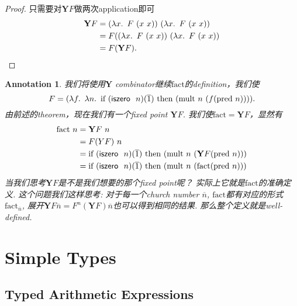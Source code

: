 \documentclass{article}
\theoremstyle{plain}
\newtheorem{annotation}[theorem]{Annotation}
\theoremstyle{nonumberplain}
\newtheorem{proof}{Proof}
\newcommand{\lam}[2]{\ensuremath{\lambda #1\ldotp~ #2}} %
\newcommand{\term}[1]{\ensuremath\mathsf{#1}}
\newcommand{\iszero}[1]{\term{iszero}~#1}
\begin{document}
\begin{proof}
只需要对$\mathbf{Y}F$做两次application即可
$$
\begin{aligned}
\mathbf{Y}F &= (\lam{x}{F~(x~x)})~(\lam{x}{F~(x~x)}) \\
&= F((\lam{x}{F~(x~x)})~(\lam{x}{F~(x~x)}) \\
&= F(\mathbf{Y}F). 
\end{aligned}
$$
\end{proof}

\begin{annotation}
\rm 我们将使用$\mathbf{Y}$ combinator继续$\text{fact}$的definition，我们使\[F = (\lam{f}{\lam{n}{\text{if}~(\iszero~n)(\overline{1})~\text{then}~(\text{mult}~n~(f(\text{pred}~n)))}}).\]由前述的theorem，现在我们有一个fixed point $\mathbf{Y}F$. 我们使$\text{fact} = \mathbf{Y}F$，显然有
$$
\begin{aligned}
\text{fact}~n &= \mathbf{Y}F~n \\
&= F({Y}F)~n \\
&= \text{if}~(\iszero~n)(\overline{1})~\text{then}~(\text{mult}~n~(\mathbf{Y}F(\text{pred}~n))) \\
&= \text{if}~(\iszero~n)(\overline{1})~\text{then}~(\text{mult}~n~(\text{fact}(\text{pred}~n))) 
\end{aligned}
$$
当我们思考$\mathbf{Y}F$是不是我们想要的那个fixed point呢？ 实际上它就是$\text{fact}$的准确定义. 这个问题我们这样思考: 对于每一个church number $\overline{n}$, $\text{fact}$都有对应的形式$\text{fact}_{\overline{n}}$, 展开$\mathbf{Y}F \overline{n} = F^n(\mathbf{Y}F) \overline{n}	$也可以得到相同的结果. 那么整个定义就是well-defined. 
\end{annotation}

\newpage
\section{Simple Types}

\subsection{Typed Arithmetic Expressions}
\end{document}
